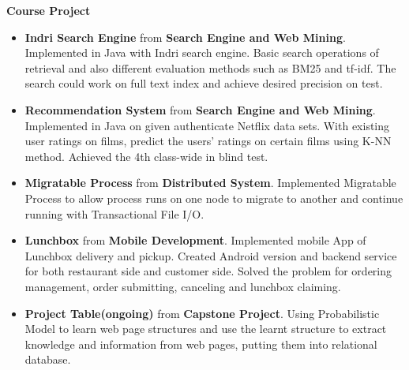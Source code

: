 \documentclass[letterpaper,10pt]{article}
\newcommand{\resheading}[1]{{\large \colorbox{mygrey}{\begin{minipage}{\textwidth}{\textbf{#1 \vphantom{p\^{E}}}}\end{minipage}}}}
\begin{document}
\resheading{Course Project}
\begin{itemize}

\item \textbf{Indri Search Engine} from \textbf{Search Engine and Web Mining}. Implemented in Java with Indri search engine. Basic search operations of retrieval and also different evaluation methods such as BM25 and tf-idf. The search could work on full text index and achieve desired precision on test.

\item \textbf{Recommendation System} from \textbf{Search Engine and Web Mining}. Implemented in Java on given authenticate Netflix data sets. With existing user ratings on films, predict the users' ratings on certain films using K-NN method. Achieved the 4th class-wide in blind test.




\item \textbf{Migratable Process} from \textbf{Distributed System}. Implemented Migratable Process to allow process runs on one node to migrate to another and continue running with Transactional File I/O.

\item \textbf{Lunchbox} from \textbf{Mobile Development}. Implemented mobile App of Lunchbox delivery and pickup. Created Android version and backend service for both restaurant side and customer side. Solved the problem for ordering management, order submitting, canceling and lunchbox claiming.

\item \textbf{Project Table(ongoing)} from \textbf{Capstone Project}. Using Probabilistic Model to learn web page structures and use the learnt structure to extract knowledge and information from web pages, putting them into relational database.

\end{itemize}
	
\end{document}
